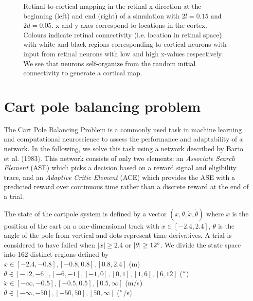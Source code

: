 \documentclass{article}
\begin{document}
\begin{figure}[h]
\begin{subfigure}[t]{0.20\linewidth}
	\end{subfigure}%
\caption{Retinal-to-cortical mapping in the retinal x direction at the beginning (left) and end (right) of a simulation with $2l = 0.15$ and $2d = 0.05$. x and y axes correspond to locations in the cortex. Colours indicate retinal connectivity (i.e. location in retinal space) with white and black regions corresponding to cortical neurons with input from retinal neurons with low and high x-values respectively. We see that neurons self-organize from the random initial connectivity to generate a cortical map.}
\label{fig:xs_075}
\end{figure}


\newpage

\section{Cart pole balancing problem}

The Cart Pole Balancing Problem is a commonly used task in machine learning and computational neuroscience to assess the performance and adaptability of a network. In the following, we solve this task using a network described by Barto et al. (1983). This network consists of only two elements: an
\textit{Associate Search Element} (ASE) which picks a decision based on a reward signal and eligibility trace, and an
\textit{Adaptive Critic Element} (ACE) which provides the ASE with a predicted reward over continuous time rather than a discrete reward at the end of a trial.

The state of the cartpole system is defined by a vector $(x, \theta, \dot x, \dot \theta)$ where $x$ is the position of the cart on a one-dimensional track with $x \in [-2.4, 2.4]$,
$\theta$ is the angle of the pole from vertical and dots represent time derivatives. A trial is considered to have failed when $|x| \geq 2.4$ or $| \theta | \geq 12 \degree$.
We divide the state space into 162 distinct regions defined by\\
$x \in [-2.4,-0.8], [-0.8,0.8],[0.8,2.4]$ (m)\\
$\theta \in [-12,-6],[-6,-1],[-1,0],[0,1],[1,6],[6,12]$ ($\degree$)\\
$\dot x \in [-\infty,-0.5],[-0.5,0.5],[0.5,\infty]$ (m/s)\\
$\dot \theta \in [-\infty,-50],[-50,50],[50,\infty]$ ($\degree$/s)
\end{document}
